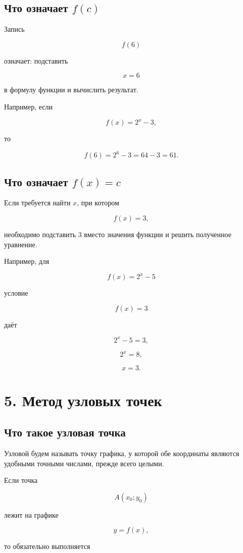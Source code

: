\documentclass[a4paper,12pt]{article}
\begin{document}
\subsection{Что означает \(f(c)\)}

Запись

\[
f(6)
\]

означает: подставить

\[
x=6
\]

в формулу функции и вычислить результат.

Например, если

\[
f(x)=2^x-3,
\]

то

\[
f(6)=2^6-3=64-3=61.
\]

\subsection{Что означает \(f(x)=c\)}

Если требуется найти \(x\), при котором

\[
f(x)=3,
\]

необходимо подставить \(3\) вместо значения функции и решить полученное уравнение.

Например, для

\[
f(x)=2^x-5
\]

условие

\[
f(x)=3
\]

даёт

\[
2^x-5=3,
\]

\[
2^x=8,
\]

\[
x=3.
\]

\section{5. Метод узловых точек}

\subsection{Что такое узловая точка}

Узловой будем называть точку графика, у которой обе координаты являются удобными точными числами, прежде всего целыми.

Если точка

\[
A(x_0;y_0)
\]

лежит на графике

\[
y=f(x),
\]

то обязательно выполняется
\end{document}
